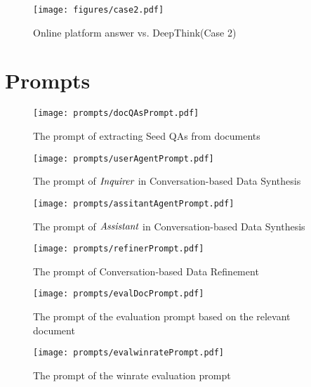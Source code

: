 \begin{figure*}[htbp]
\centering
\texttt{[image: figures/case2.pdf]}
    \caption{Online platform answer vs. DeepThink(Case 2)}
    \label{fig:case2}
\end{figure*}




\section{Prompts}
\label{sec:appPrompts}
\begin{figure*}[htbp]
\centering
\texttt{[image: prompts/docQAsPrompt.pdf]}
    \caption{The prompt of extracting Seed QAs from documents}
    \label{fig:docQAsPrompts}
\end{figure*}

\begin{figure*}[htbp]
\centering
\texttt{[image: prompts/userAgentPrompt.pdf]}
    \caption{The prompt of $\textit{Inquirer}$ in Conversation-based Data Synthesis}
    \label{fig:userAgentPrompt}
\end{figure*}

\begin{figure*}[htbp]
\centering
\texttt{[image: prompts/assitantAgentPrompt.pdf]}
    \caption{The prompt of $\textit{Assistant}$ in Conversation-based Data Synthesis}
    \label{fig:assitantAgentPrompt}
\end{figure*}

\begin{figure*}[htbp]
\centering
\texttt{[image: prompts/refinerPrompt.pdf]}
    \caption{The prompt of Conversation-based Data Refinement}
    \label{fig:refinerPrompt}
\end{figure*}

\begin{figure*}[htbp]
\centering
\texttt{[image: prompts/evalDocPrompt.pdf]}
    \caption{The prompt of the evaluation prompt based on the relevant document}
    \label{fig:evalDocPrompt}
\end{figure*}

\begin{figure*}[htbp]
\centering
\texttt{[image: prompts/evalwinratePrompt.pdf]}
    \caption{The prompt of the winrate evaluation prompt}
    \label{fig:evalwinratePrompt}
\end{figure*}



